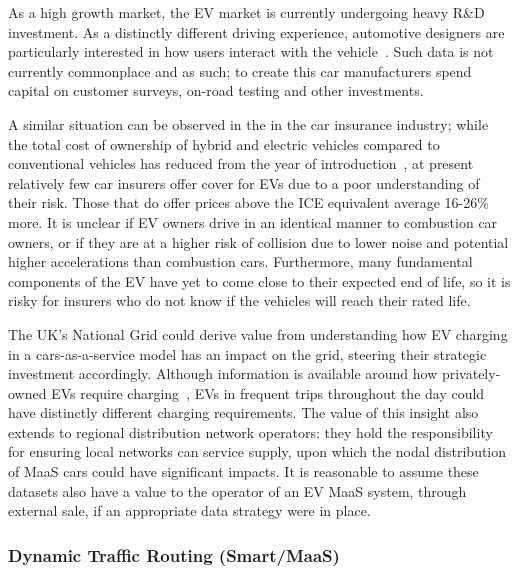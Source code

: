 \documentclass[b5paper,10pt]{article}
\begin{document}
As a high growth market, the EV market is currently undergoing heavy
R\&D investment. As a distinctly different driving experience,
automotive designers are particularly interested in how users interact
with the vehicle~\citep{ferreira-et-al:2013}. Such data is not
currently commonplace and as such; to create this car manufacturers
spend capital on customer surveys, on-road testing and other
investments.

A similar situation can be observed in the in the car insurance
industry; while the total cost of ownership of hybrid and electric
vehicles compared to conventional vehicles has reduced from the year
of introduction~\cite{palmer-et-al:2018}, at present relatively few
car insurers offer cover for EVs due to a poor understanding of their
risk. Those that do offer prices above the ICE equivalent average
16-26\% more. It is unclear if EV owners drive in an identical manner
to combustion car owners, or if they are at a higher risk of collision
due to lower noise and potential higher accelerations than combustion
cars. Furthermore, many fundamental components of the EV have yet to
come close to their expected end of life, so it is risky for insurers
who do not know if the vehicles will reach their rated life.

The UK's National Grid could derive value from understanding how EV
charging in a cars-as-a-service model has an impact on the grid,
steering their strategic investment accordingly.  Although information
is available around how privately-owned EVs require
charging~\citep{kennel-et-al:2012,darabi+ferdowsi:2013}, EVs in
frequent trips throughout the day could have distinctly different
charging requirements. The value of this insight also extends to
regional distribution network operators: they hold the responsibility
for ensuring local networks can service supply, upon which the nodal
distribution of MaaS cars could have significant impacts. It is
reasonable to assume these datasets also have a value to the operator
of an EV MaaS system, through external sale, if an appropriate data
strategy were in place.

\subsubsection{Dynamic Traffic Routing (Smart/MaaS)} 
\end{document}

